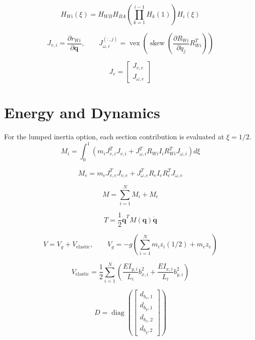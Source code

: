 \documentclass[11pt]{article}
\begin{document}
\begin{equation}
H_{Wi}(\xi)=H_{WB}H_{BA}\left(\prod_{k=1}^{i-1}H_k(1)\right)H_i(\xi)
\end{equation}

\begin{equation}
J_{v,i}=\frac{\partial r_{Wi}}{\partial\boldsymbol q},\qquad J_{\omega,i}^{(:,j)}=\operatorname{vex}\!\left(\operatorname{skew}\!\left(\frac{\partial R_{Wi}}{\partial q_j}R_{Wi}^{T}\right)\right)
\end{equation}

\begin{equation}
J_e=\begin{bmatrix}J_{v,e}\\J_{\omega,e}\end{bmatrix}
\end{equation}


\section{Energy and Dynamics}
For the lumped inertia option, each section contribution is evaluated at $\xi=1/2$.
\begin{equation}
M_i=\int_0^1\!\left(m_iJ_{v,i}^{T}J_{v,i}+J_{\omega,i}^{T}R_{Wi}I_iR_{Wi}^{T}J_{\omega,i}\right)d\xi
\end{equation}

\begin{equation}
M_e=m_eJ_{v,e}^{T}J_{v,e}+J_{\omega,e}^{T}R_eI_eR_e^TJ_{\omega,e}
\end{equation}

\begin{equation}
M=\sum_{i=1}^{N}M_i+M_e\label{eq:mass-assembly}
\end{equation}

\begin{equation}
T=\frac12\dot{\boldsymbol q}^{T}M(\boldsymbol q)\dot{\boldsymbol q}
\end{equation}

\begin{equation}
V=V_g+V_{\mathrm{elastic}},\qquad V_g=-g\!\left(\sum_{i=1}^{N}m_i z_i(1/2)+m_ez_e\right)
\end{equation}

\begin{equation}
V_{\mathrm{elastic}}=\frac12\sum_{i=1}^{N}\left(\frac{EI_{y,i}}{L_i}b_{x,i}^{2}+\frac{EI_{x,i}}{L_i}b_{y,i}^{2}\right)
\end{equation}

\begin{equation}
D=\operatorname{diag}\!\left(\begin{bmatrix}d_{b_x,1}\\d_{b_y,1}\\d_{b_x,2}\\d_{b_y,2}\end{bmatrix}\right)
\end{equation}
\end{document}
